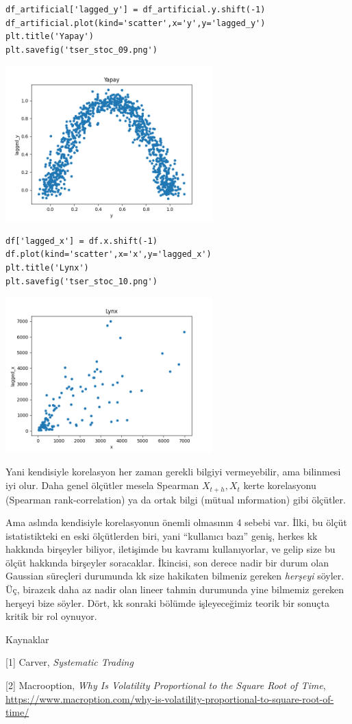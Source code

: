 \documentclass[12pt,fleqn]{article}\usepackage{../../common}
\begin{document}
\begin{verbatim}
df_artificial['lagged_y'] = df_artificial.y.shift(-1)
df_artificial.plot(kind='scatter',x='y',y='lagged_y')
plt.title('Yapay')
plt.savefig('tser_stoc_09.png')
\end{verbatim}

\includegraphics[height=6cm]{tser_stoc_09.png}

\begin{verbatim}
df['lagged_x'] = df.x.shift(-1)
df.plot(kind='scatter',x='x',y='lagged_x')
plt.title('Lynx')
plt.savefig('tser_stoc_10.png')
\end{verbatim}

\includegraphics[height=6cm]{tser_stoc_10.png}

Yani kendisiyle korelasyon her zaman gerekli bilgiyi vermeyebilir, ama bilinmesi
iyi olur. Daha genel ölçütler mesela Spearman $X_{t+h},X_t$ kerte korelasyonu
(Spearman rank-correlation) ya da ortak bilgi (mütual ınformation) gibi
ölçütler.

Ama aslında kendisiyle korelasyonun önemli olmasının 4 sebebi var. İlki, bu
ölçüt istatistikteki en eski ölçütlerden biri, yani ``kullanıcı bazı'' geniş,
herkes kk hakkında birşeyler biliyor, iletişimde bu kavramı kullanıyorlar, ve
gelip size bu ölçüt hakkında birşeyler soracaklar. İkincisi, son derece nadir
bir durum olan Gaussian süreçleri durumunda kk size hakikaten bilmeniz gereken
{\em herşeyi} söyler. Üç, birazcık daha az nadir olan lineer tahmin durumunda
yine bilmemiz gereken herşeyi bize söyler. Dört, kk sonraki bölümde
işleyeceğimiz teorik bir sonuçta kritik bir rol oynuyor.
















Kaynaklar

[1] Carver, {\em Systematic Trading}

[2] Macrooption, {\em Why Is Volatility Proportional to the Square Root of  Time},
    \url{https://www.macroption.com/why-is-volatility-proportional-to-square-root-of-time/}
\end{document}
